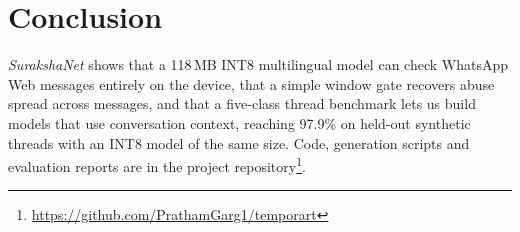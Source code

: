 \documentclass[sigconf,9pt]{acmart}
\begin{document}
\section{Conclusion}
\textit{SurakshaNet} shows that a 118\,MB INT8 multilingual model can check WhatsApp Web messages entirely on the device, that a simple window gate recovers abuse spread across messages, and that a five-class thread benchmark lets us build models that use conversation context, reaching 97.9\% on held-out synthetic threads with an INT8 model of the same size. Code, generation scripts and evaluation reports are in the project repository\footnote{\url{https://github.com/PrathamGarg1/temporart}}.



\end{document}
